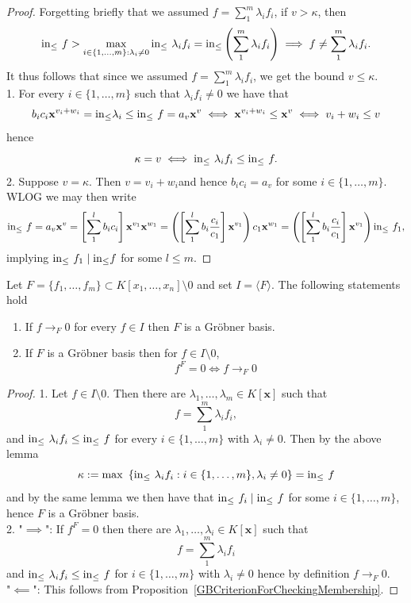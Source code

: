 \begin{proof}
    Forgetting briefly that we assumed $f=\sum_1^m \lambda_if_i$, if $v>\kappa$, then
    $$\mathrm{in}_\leq\ f > \max_{i\in\{1,\dots,m\}: \lambda_i\neq 0} \mathrm{in}_\leq\ \lambda_if_i =\mathrm{in}_\leq\left( \sum_1^m \lambda_if_i\right) \implies f\neq \sum_1^m \lambda_if_i.$$
    It thus follows that since we assumed $f=\sum_1^m\lambda_if_i$, we get the bound $v\leq \kappa$.\\
    1.
    For every $i\in\{1,\dots,m\}$ such that $\lambda_if_i\neq0 $ we have that
    $$b_ic_i\mathbf{x}^{v_i+w_i}=\mathrm{in}_\leq \lambda_i \leq \mathrm{in}_\leq\ f=a_v\mathbf{x}^v \iff \mathbf{x}^{v_i+w_i} \leq \mathbf{x}^v \iff v_i+w_i \leq v$$
    hence 
    $$\kappa = v \iff \mathrm{in}_\leq\ \lambda_if_i\leq\mathrm{in}_\leq\ f.$$
    2. Suppose $v = \kappa$. Then $v = v_i+w_i$and hence  $b_ic_i = a_v$ for some $i\in\{1,\dots,m\}$. WLOG we may then write 
    $$\mathrm{in}_\leq\ f = a_v\mathbf{x}^v = \left[\sum_1^l b_ic_i\right]\mathbf{x}^{v_1}\mathbf{x}^{w_1} = \left(\left[\sum_1^l b_i\frac{c_i}{c_1}\right]\mathbf{x}^{v_1}\right)c_1\mathbf{x}^{w_1} = \left(\left[\sum_1^l b_i\frac{c_i}{c_1}\right]\mathbf{x}^{v_1}\right)\mathrm{in}_\leq\ f_1, $$
    implying $\mathrm{in}_\leq\ f_1 \mid \mathrm{in}_\leq f$ for some $l\leq m.$
\end{proof}
\begin{lemma}\label{CriterionForCheckingSetBeingGB}
    Let $F=\{f_1,\dots,f_m\}\subset K[x_1,\dots,x_n]\setminus 0$ and set $I=\langle F\rangle$. The following statements hold
    \begin{enumerate}
        \item If $f\to_F 0$ for every $f\in I$ then $F$ is a Gröbner basis.
        \item If $F$ is a Gröbner basis then for $f\in I\setminus 0$,
    $$f^F = 0 \iff f\to_F 0 $$
    \end{enumerate}
\end{lemma}
\begin{proof}
    1. Let $f\in I\setminus 0$. Then there are $\lambda_1,\dots,\lambda_m\in K[\mathbf{x}]$ such that 
    $$f = \sum_1^m \lambda_if_i,$$
    and $\mathrm{in}_\leq\ \lambda_if_i\leq \mathrm{in}_\leq\ f$ for every $i\in\{1,\dots,m\}$ with $\lambda_i\neq0$. Then by the above lemma 
    $$\kappa:= \max\ \left\{\inn \ \lambda_if_i : i\in\{1,\dots,m\}, \lambda_i\neq0\right\} = \inn \ f$$
     and by the same lemma we then have that $\mathrm{in}_\leq\ f_i\mid \mathrm{in}_\leq\ f$ for some $i\in \{1,\dots,m\}$, hence $F$ is a Gröbner basis.\\
     2. "$\implies$": If $f^F=0$ then there are $\lambda_1,\dots,\lambda_i\in K[\mathbf{x}]$ such that 
     $$f= \sum_1^m \lambda_if_i$$
     and $\mathrm{in}_\leq\ \lambda_if_i \leq \mathrm{in}_\leq\ f$ for $i\in\{1,\dots,m\}$ with $\lambda_i\neq0$ hence by definition $f \to_F 0$.\\
     "$\impliedby$": This follows from Proposition~\ref{GBCriterionForCheckingMembership}.
\end{proof}
